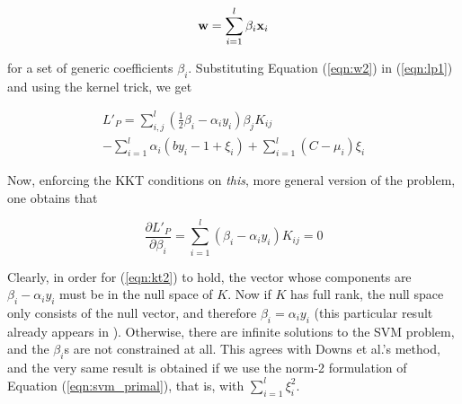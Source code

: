 \begin{equation} \label{eqn:w2}
  \mathbf{w} = \sum_{i=1}^l \beta_i \mathbf{x}_i
\end{equation}

for a set of generic coefficients $\beta_i$. Substituting Equation
(\ref{eqn:w2}) in (\ref{eqn:lp1}) and using the kernel trick, we get

\begin{eqnarray} \label{eqn:svm_primal_general}
  L'_P =   \sum_{i,j}^l \left( \frac{1}{2}\beta_i-\alpha_i y_i \right) \beta_j K_{ij} \\
         - \sum_{i=1}^l \alpha_i (b y_i -1 +\xi_i) + \sum_{i=1}^l (C - \mu_i) \xi_i \nonumber
\end{eqnarray}

Now, enforcing the KKT conditions on \emph{this}, more general version
of the problem, one obtains that

\begin{equation} \label{eqn:kt2}
  \frac{\partial L'_P}{\partial \beta_i} = \sum_{i=1}^l (\beta_i - \alpha_i y_i) K_{ij} = 0
\end{equation}

Clearly, in order for (\ref{eqn:kt2}) to hold, the vector whose
components are $\beta_i-\alpha_i y_i$ must be in the null space of
$K$. Now if $K$ has full rank, the null space only consists of the
null vector, and therefore $\beta_i = \alpha_i y_i$ (this particular
result already appears in \cite{KeerthiCDC06}). Otherwise, there are
infinite solutions to the SVM problem, and the $\beta_i$s are not
constrained at all. This agrees with Downs et al.'s method, and the
very same result is obtained if we use the norm-2 formulation of
Equation (\ref{eqn:svm_primal}), that is, with $\sum_{i=1}^l \xi_i^2$.
